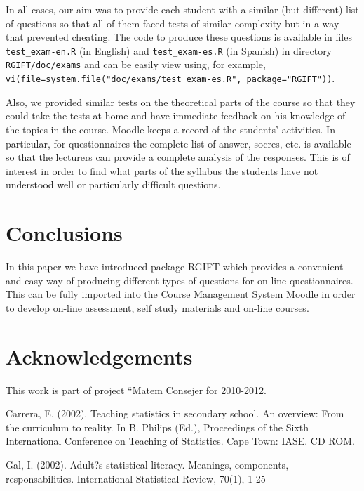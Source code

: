 \documentclass[a4paper]{article}
\newcommand{\code}[1]{\texttt{#1}}
\newcommand{\pkg}[1]{\textsf{#1}}
\begin{document}
In all cases, our aim was to provide each student with a similar (but
different) list of questions so that all of them faced tests of similar
complexity but in a way that prevented cheating.
The code to produce these questions is available in files 
\verb+test_exam-en.R+ (in English) and \verb+test_exam-es.R+ (in Spanish)
in directory \verb+RGIFT/doc/exams+ and can be easily view using, for example,
\code{vi(file=system.file("doc/exams/test\_exam-es.R", package="RGIFT"))}.

Also, we provided similar tests on the theoretical parts of the course so that
they could take the tests at home and have immediate feedback on his knowledge
of the topics in the course. Moodle keeps a record of the students' activities.
In particular, for questionnaires the complete list of answer, socres, etc.  is
available so that the lecturers can provide a complete analysis of the
responses. This is of interest in order to find what parts of the syllabus the
students have not understood well or particularly difficult questions.



\section{Conclusions}

In this paper we have introduced package \pkg{RGIFT} which provides a 
convenient and easy way of producing different types of questions
for on-line questionnaires. This can be fully imported into the
Course Management System Moodle in order to develop on-line assessment,
self study materials and on-line courses. 

\section{Acknowledgements}

This work is part of project ``Matem
Consejer
for 2010-2012.


%

%


Carrera, E. (2002). Teaching statistics in secondary school. An overview: From the curriculum to reality. In B. Philips (Ed.), Proceedings of the Sixth International Conference on  Teaching of Statistics. Cape Town: IASE. CD ROM.

Gal, I. (2002).  Adult?s statistical literacy. Meanings, components, responsabilities. International Statistical Review, 70(1), 1-25


%
%
%
\end{document}
